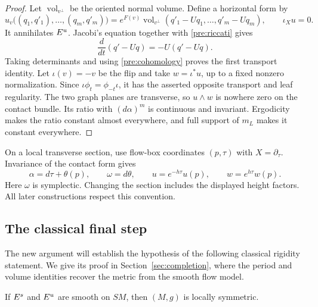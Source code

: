 \begin{proof}
Let $\operatorname{vol}_{v^\perp}$ be the oriented normal volume.
Define a horizontal form by
\[
 u_v\bigl((q_1,q'_1),\ldots,(q_m,q'_m)\bigr)
 =e^{F(v)}\operatorname{vol}_{v^\perp}
      (q'_1-Uq_1,\ldots,q'_m-Uq_m),
 \qquad \iota_Xu=0.
\]
It annihilates $E^u$. Jacobi's equation together with
\eqref{pre:riccati} gives
\[
 \frac{d}{dt}(q'-Uq)=-U(q'-Uq).
\]
Taking determinants and using \eqref{pre:cohomology} proves the
first transport identity. Let $\iota(v)=-v$ be the flip and take
$w=\iota^*u$, up to a fixed nonzero normalization. Since
$\iota\phi_t=\phi_{-t}\iota$, it has the asserted opposite transport
and leaf regularity. The two graph planes are transverse, so
$u\wedge w$ is nowhere zero on the contact bundle. Its ratio with
$(d\alpha)^m$ is continuous and invariant. Ergodicity makes the
ratio constant almost everywhere, and full support of $m_L$ makes
it constant everywhere.
\end{proof}

On a local transverse section, use flow-box coordinates $(p,\tau)$
with $X=\partial_\tau$. Invariance of the contact form gives
\begin{equation}\label{pre:section-conventions}
 \alpha=d\tau+\theta(p),\qquad \omega=d\theta,
 \qquad u=e^{-h\tau}u(p),\qquad w=e^{h\tau}w(p).
\end{equation}
Here $\omega$ is symplectic. Changing the section includes the
displayed height factors. All later constructions respect this
convention.

\subsection{The classical final step}

The new argument will establish the hypothesis of the following
classical rigidity statement. We give its proof in
Section~\ref{sec:completion}, where the period and volume identities
recover the metric from the smooth flow model.

\begin{proposition}\label{pre:smooth-rigidity}
If $E^s$ and $E^u$ are smooth on $SM$, then $(M,g)$ is locally
symmetric.
\end{proposition}
